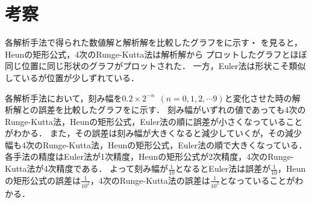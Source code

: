 \documentclass[a4j, 10pt, titlepage]{jsarticle}
\begin{document}
{\section*{考察}
各解析手法で得られた数値解と解析解を比較したグラフをに示す・
を見ると，Heunの矩形公式，4次のRunge-Kutta法は解析解から
プロットしたグラフとほぼ同じ位置に同じ形状のグラフがプロットされた．
一方，Euler法は形状こそ類似しているが位置が少しずれている．

各解析手法において，刻み幅を$0.2 \times 2^{-n} ~~(n = 0, 1, 2, \cdots 9)$と変化させた時の解析解との誤差を比較したグラフをに示す．
刻み幅がいずれの値であっても4次のRunge-Kutta法，Heunの矩形公式，Euler法の順に誤差が小さくなっていることがわかる．
また，その誤差は刻み幅が大きくなると減少していくが，その減少幅も4次のRunge-Kutta法，Heunの矩形公式，Euler法の順で大きくなっている．
各手法の精度はEuler法が1次精度，Heunの矩形公式が2次精度，4次のRunge-Kutta法が4次精度である．
よって刻み幅が$\frac{1}{10}$となるとEuler法は誤差が$\frac{1}{10}$，Heunの矩形公式の誤差は$\frac{1}{10^2}$，4次のRunge-Kutta法の誤差は$\frac{1}{10^3}$となっていることがわかる．



}
\end{document}
